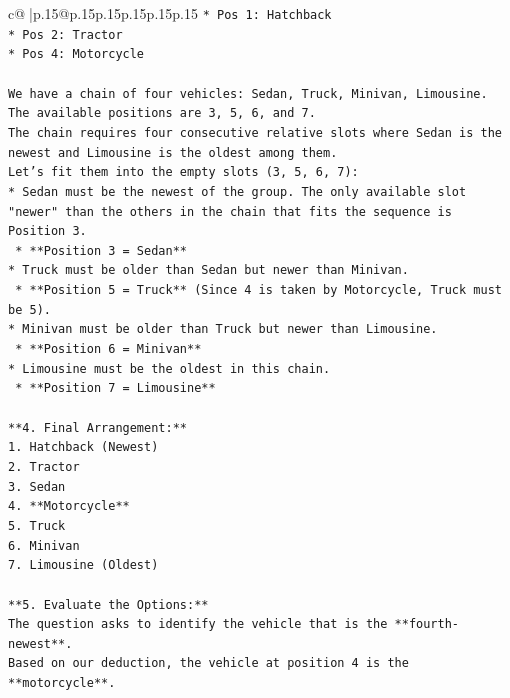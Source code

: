 \documentclass{article}
\begin{document}
{\begin{supertabular}{c@{$\;$}|p{.15\linewidth}@{}p{.15\linewidth}p{.15\linewidth}p{.15\linewidth}p{.15\linewidth}p{.15\linewidth}}
{{{\texttt{*   Pos 1: Hatchback} \\
\texttt{*   Pos 2: Tractor} \\
\texttt{*   Pos 4: Motorcycle} \\
\\ 
\texttt{We have a chain of four vehicles: Sedan, Truck, Minivan, Limousine.} \\
\texttt{The available positions are 3, 5, 6, and 7.} \\
\texttt{The chain requires four consecutive relative slots where Sedan is the newest and Limousine is the oldest among them.} \\
\texttt{Let's fit them into the empty slots (3, 5, 6, 7):} \\
\texttt{*   Sedan must be the newest of the group. The only available slot "newer" than the others in the chain that fits the sequence is Position 3.} \\
\texttt{    *   **Position 3 = Sedan**} \\
\texttt{*   Truck must be older than Sedan but newer than Minivan.} \\
\texttt{    *   **Position 5 = Truck** (Since 4 is taken by Motorcycle, Truck must be 5).} \\
\texttt{*   Minivan must be older than Truck but newer than Limousine.} \\
\texttt{    *   **Position 6 = Minivan**} \\
\texttt{*   Limousine must be the oldest in this chain.} \\
\texttt{    *   **Position 7 = Limousine**} \\
\\ 
\texttt{**4. Final Arrangement:**} \\
\texttt{1.  Hatchback (Newest)} \\
\texttt{2.  Tractor} \\
\texttt{3.  Sedan} \\
\texttt{4.  **Motorcycle**} \\
\texttt{5.  Truck} \\
\texttt{6.  Minivan} \\
\texttt{7.  Limousine (Oldest)} \\
\\ 
\texttt{**5. Evaluate the Options:**} \\
\texttt{The question asks to identify the vehicle that is the **fourth{-}newest**.} \\
\texttt{Based on our deduction, the vehicle at position 4 is the **motorcycle**.} \\
}}}
\end{supertabular}}
\end{document}
